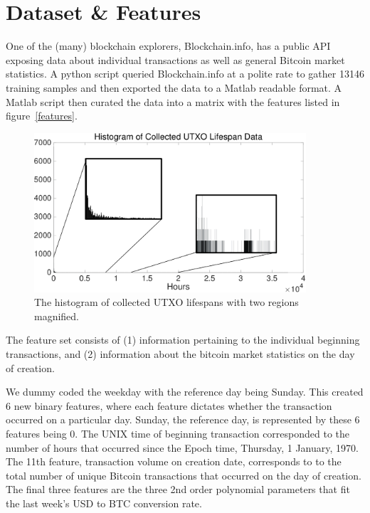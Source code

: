 \documentclass[12pt]{article}
\begin{document}
\section{Dataset \& Features}
One of the (many) blockchain explorers, Blockchain.info, has a public API exposing data about individual transactions as well as general Bitcoin market statistics. A python script queried Blockchain.info at a polite rate to gather 13146 training samples and then exported the data to a Matlab readable format. A Matlab script then curated the data into a matrix with the features listed in figure~\ref{features}.

\begin{figure}
\begin{center}
\includegraphics[width=0.9\textwidth]{figures/hist.png}
\end{center}
\caption{The histogram of collected UTXO lifespans with two regions magnified.}
\label{hist}
\end{figure}

The feature set consists of (1) information pertaining to the individual beginning transactions, and (2) information about the bitcoin market statistics on the day of creation.

We dummy coded the weekday with the reference day being Sunday. This created 6 new binary features, where each feature dictates whether the transaction occurred on a particular day. Sunday, the reference day, is represented by these 6 features being 0. The UNIX time of beginning transaction corresponded to the number of hours that occurred since the Epoch time, Thursday, 1 January, 1970. The 11th feature, transaction volume on creation date, corresponds to to the total number of unique Bitcoin transactions that occurred on the day of creation. The final three features are the three 2nd order polynomial parameters that fit the last week's USD to BTC conversion rate.
\end{document}
